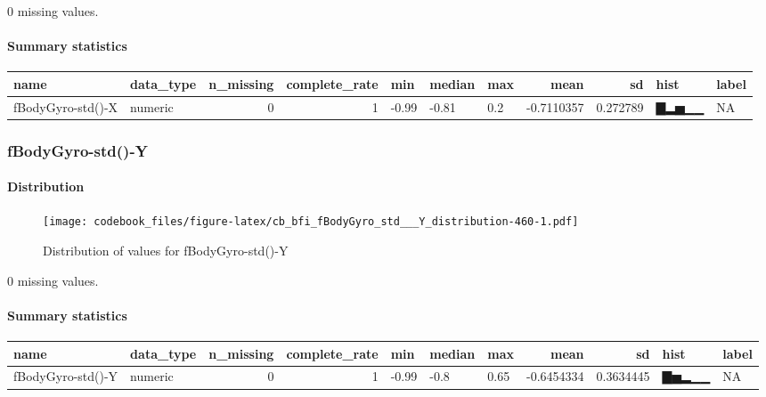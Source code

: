 \documentclass[
]{article}
\begin{document}
0 missing values.

\hypertarget{fBodyGyro_std___X_summary}{%
\paragraph{Summary statistics}\label{fBodyGyro_std___X_summary}}

\begin{longtable}[]{@{}llrrlllrrll@{}}
\toprule
name & data\_type & n\_missing & complete\_rate & min & median & max &
mean & sd & hist & label \\
\midrule
\endhead
fBodyGyro-std()-X & numeric & 0 & 1 & -0.99 & -0.81 & 0.2 & -0.7110357 &
0.272789 & ▇▂▅▁▁ & NA \\
\bottomrule
\end{longtable}

\hypertarget{fBodyGyro_std___Y}{%
\subsubsection{fBodyGyro-std()-Y}\label{fBodyGyro_std___Y}}

\hypertarget{fBodyGyro_std___Y_distribution}{%
\paragraph{Distribution}\label{fBodyGyro_std___Y_distribution}}

\begin{figure}
\centering
\texttt{[image: codebook\_files/figure-latex/cb\_bfi\_fBodyGyro\_std\_\_\_Y\_distribution-460-1.pdf]}
\caption{Distribution of values for fBodyGyro-std()-Y}
\end{figure}

0 missing values.

\hypertarget{fBodyGyro_std___Y_summary}{%
\paragraph{Summary statistics}\label{fBodyGyro_std___Y_summary}}

\begin{longtable}[]{@{}llrrlllrrll@{}}
\toprule
name & data\_type & n\_missing & complete\_rate & min & median & max &
mean & sd & hist & label \\
\midrule
\endhead
fBodyGyro-std()-Y & numeric & 0 & 1 & -0.99 & -0.8 & 0.65 & -0.6454334 &
0.3634445 & ▇▅▂▁▁ & NA \\
\bottomrule
\end{longtable}
\end{document}
